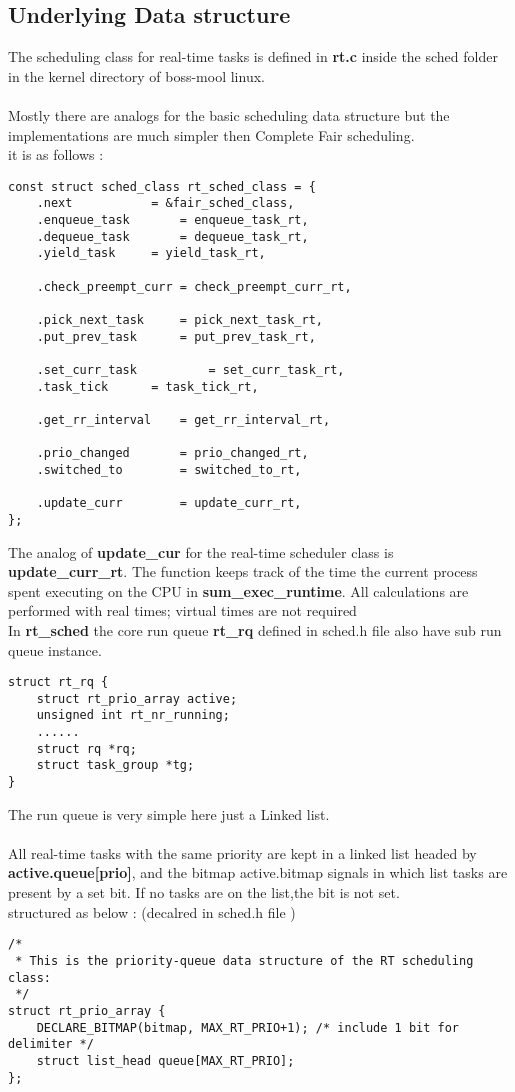 \documentclass[a4paper]{article}
\begin{document}
\subsection{Underlying Data structure}
The scheduling class for real-time tasks is defined in \textbf{rt.c} inside the sched folder in the kernel directory of boss-mool linux.\\ \\
Mostly there are analogs for the basic scheduling data structure but the implementations are much simpler then Complete Fair scheduling.\\
it is as follows :
\begin{verbatim}
const struct sched_class rt_sched_class = {
	.next			= &fair_sched_class,
	.enqueue_task		= enqueue_task_rt,
	.dequeue_task		= dequeue_task_rt,
	.yield_task		= yield_task_rt,

	.check_preempt_curr	= check_preempt_curr_rt,

	.pick_next_task		= pick_next_task_rt,
	.put_prev_task		= put_prev_task_rt,
	
	.set_curr_task          = set_curr_task_rt,
	.task_tick		= task_tick_rt,

	.get_rr_interval	= get_rr_interval_rt,

	.prio_changed		= prio_changed_rt,
	.switched_to		= switched_to_rt,

	.update_curr		= update_curr_rt,
};

\end{verbatim}
The analog of \textbf{ update\_cur} for the real-time scheduler class is \textbf{update\_curr\_rt}. The function keeps track of the time the current process spent executing on the CPU in \textbf{sum\_exec\_runtime}. All calculations are performed with real times; virtual times are not required\\
In \textbf{rt\_sched} the core run queue \textbf{rt\_rq} defined in sched.h file also have sub run queue instance.\\
\begin{verbatim}
struct rt_rq {
	struct rt_prio_array active;
	unsigned int rt_nr_running;
	......
	struct rq *rq;
	struct task_group *tg;
}
\end{verbatim}

The run queue is very simple here just a Linked list.\\ \\
All real-time tasks with the same priority are kept in a linked list headed by \textbf{active.queue[prio]}, and the bitmap active.bitmap signals in which list tasks are present by a set bit. If no tasks are on the list,the bit is not set.\\
structured as below : (decalred in sched.h file )
\begin{verbatim}
/*
 * This is the priority-queue data structure of the RT scheduling class:
 */
struct rt_prio_array {
	DECLARE_BITMAP(bitmap, MAX_RT_PRIO+1); /* include 1 bit for delimiter */
	struct list_head queue[MAX_RT_PRIO];
};
\end{verbatim}
\end{document}
